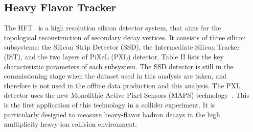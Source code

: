 \documentclass[%
 reprint,	
 amsmath,amssymb,
 aps,
 prc,
]{revtex4-1}
\begin{document}
\subsection{\label{sec:dataset:hft}Heavy Flavor Tracker}
The HFT~\cite{HFTQM14} is a high resolution silicon detector system, that aims for the topological reconstruction of secondary decay vertices. It consists of three silicon subsystems: the Silicon Strip Detector (SSD), the Intermediate Silicon Tracker (IST), and the two layers of PiXeL (PXL) detector. 
Table II lists the key characteristic parameters of each subsystem. The SSD detector is still in the commissioning stage when the dataset used in this analysis are taken, and therefore is not used in the offline data production and this analysis.
The PXL detector uses the new Monolithic Active Pixel Sensors (MAPS) technology~\cite{PXL}. This is the first application of this technology in a collider experiment. It is particularly designed to measure heavy-flavor hadron decays in the high multiplicity heavy-ion collision environment.

\begin{table}[t]
\label{table:HFT} 
\end{table}
\end{document}
